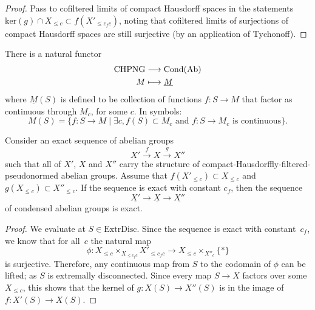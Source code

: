 \begin{proof}
  \leanok
  Pass to cofiltered limits of compact Hausdorff spaces in the statements $\mathrm{ker}(g)\cap X_{\leq c}\subset f(X'_{\leq c_fc})$,
  noting that cofiltered limits of surjections of compact Hausdorff spaces are still surjective (by an application of Tychonoff).
\end{proof}

\begin{definition}
  \label{CHPNG-to-Cond}
  \leanok
  There is a natural functor
  \begin{align*}
    \text{CHPNG} &\longrightarrow \operatorname{Cond}(\operatorname{Ab}) \\
    M &\longmapsto \underline{M}
  \end{align*}
  where $\underline{M}(S)$ is defined to be collection of functions $f \colon S \to M$ that factor as continuous through $M_c$, for some $c$.
  In symbols:
  \[ M(S) = \{f \colon S \to M \mid \exists c, f(S) \subset M_c \text{ and $f \colon S \to M_c$ is continuous}\}. \]
\end{definition}

\begin{proposition}
  \label{CHPNG-Cond-exact}
  \leanok
  Consider an exact sequence of abelian groups
  \[ X'\overset{f}{\longrightarrow} X\overset{g}{\longrightarrow} X'' \]
  such that all of $X'$, $X$ and $X''$ carry the structure of compact-Hausdorffly-filtered-pseudonormed abelian groups.
  Assume that $f(X'_{\leq c})\subset X_{\leq c}$ and $g(X_{\leq c})\subset X''_{\leq c}$.
  If the sequence is exact with constant $c_f$,
  then the sequence
  \[ \underline{X'}\longrightarrow \underline{X}\longrightarrow\underline{X''} \]
  of condensed abelian groups is exact.
\end{proposition}

\begin{proof}
  \leanok
  We evaluate at $S\in \mathrm{ExtrDisc}$.
  Since the sequence is exact with constant~$c_f$,
  we know that for all~$c$ the natural map
  \[
    \phi \colon X_{\le c} \times_{X_{\le c_fc}} X'_{\le c_fc} \to X_{\le c} \times_{X''_c} \{*\}
  \]
  is surjective.
  Therefore, any continuous map from $S$ to the codomain of $\phi$ can be lifted;
  as $S$ is extremally disconnected.
  Since every map $S \to X$ factors over some $X_{\le c}$,
  this shows that the kernel of $g \colon X(S)\to X''(S)$ is in the image of $f \colon X'(S)\to X(S)$.
\end{proof}

